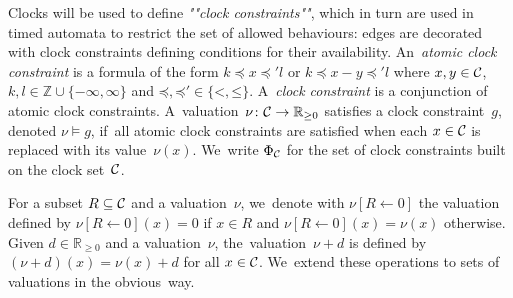 Clocks will be used to define \emph{""clock constraints""}, which in turn
are used in timed automata to restrict the set of allowed behaviours:
edges are decorated with clock constraints defining conditions for
their availability.
An~\emph{atomic clock constraint} is a formula of the form $k \preceq
x \preceq' l$ or $k \preceq x - y \preceq' l$ where $x,y \in \mathcal{C}$,
$k,l \in \mathbb{Z}\cup\{-\infty,\infty\}$ and
${\mathord\preceq,\mathord\preceq' \in
  \{\mathord<,\mathord\leq\}}$. A~\emph{clock constraint} is a
conjunction of atomic clock constraints.  A~valuation~$\nu\colon
\mathcal{C}\to\mathbb{R}_{\geq 0}$ satisfies a clock constraint~$g$, denoted $\nu \models g$,
if~all atomic clock constraints are satisfied when each $x\in \mathcal{C}$
is replaced with its value~$\nu(x)$.  We~write $\Phi_{\mathcal{C}}$ for the
set of clock constraints built on the clock set~$\mathcal{C}$.



For a subset $R\subseteq \mathcal{C}$ and a valuation~$\nu$, we~denote
with ${\nu[R \leftarrow 0]}$ the valuation defined by ${\nu[R
    \leftarrow 0](x) = 0}$ if $x \in R$ and ${\nu[R\leftarrow 0](x) =
  \nu(x)}$ otherwise. Given $d \in \mathbb{R}_{\geq 0}$ and a
valuation~$\nu$, the~valuation~$\nu+d$ is defined by $(\nu+d)(x) =
\nu(x)+d$ for all $x\in \mathcal{C}$. We~extend these operations to sets
of valuations in the obvious~way.


%


